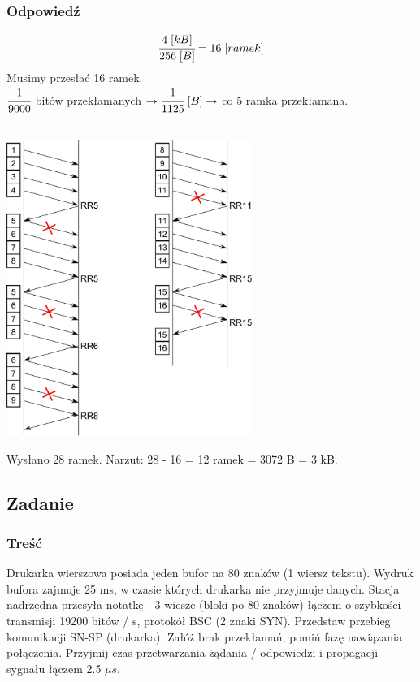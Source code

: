 		\subsubsection{Odpowiedź}
			$$ \cfrac{4\;[kB]}{256\;[B]}=16\;[ramek] $$
			Musimy przesłać 16 ramek.\\
			$ \cfrac{1}{9000} $ bitów przekłamanych $ \rightarrow \cfrac{1}{1125}\;[B] \rightarrow $ co 5 ramka przekłamana.\\\\
			\begin{center}
				\includegraphics[width=8.0cm]{./images/zadanie12.pdf}
			\end{center}
			Wysłano 28 ramek. Narzut: 28 - 16 = 12 ramek = 3072 B = 3 kB.
\newpage		
	\subsection{Zadanie}
		\subsubsection{Treść}
			Drukarka wierszowa posiada jeden bufor na 80 znaków (1 wiersz tekstu). Wydruk bufora zajmuje 25 ms, w czasie których drukarka nie przyjmuje danych. Stacja nadrzędna przesyła notatkę - 3 wiesze (bloki po 80 znaków) łączem o szybkości transmisji 19200 bitów / s, protokół BSC (2 znaki SYN). Przedstaw przebieg komunikacji SN-SP (drukarka). Załóż brak przekłamań, pomiń fazę nawiązania połączenia. Przyjmij czas przetwarzania żądania / odpowiedzi i propagacji sygnału łączem 2.5 $ \mu s $.
